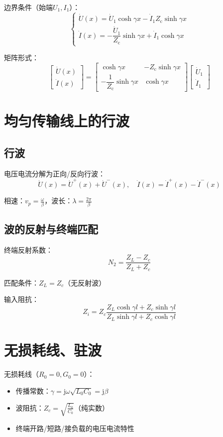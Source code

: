 边界条件（始端$U_1,I_1$）：
\[
\begin{cases} 
\dot{U}(x) = \dot{U}_1 \cosh \gamma x - \dot{I}_1 Z_{\mathrm{c}} \sinh \gamma x \\ 
\dot{I}(x) = -\dfrac{\dot{U}_1}{Z_{\mathrm{c}}} \sinh \gamma x + \dot{I}_1 \cosh \gamma x 
\end{cases}
\]

矩阵形式：
\[
\begin{bmatrix} 
\dot{U}(x) \\ 
\dot{I}(x) 
\end{bmatrix} = 
\begin{bmatrix} 
\cosh \gamma x & -Z_{\text{c}} \sinh \gamma x \\ 
-\dfrac{1}{Z_{\text{c}}} \sinh \gamma x & \cosh \gamma x 
\end{bmatrix}
\begin{bmatrix} 
\dot{U}_1 \\ 
\dot{I}_1 
\end{bmatrix}
\]

\section{均匀传输线上的行波}
\subsection{行波}
电压电流分解为正向/反向行波：
\[
\dot{U}(x) = \dot{U}^+(x) + \dot{U}^-(x),\quad \dot{I}(x) = \dot{I}^+(x) - \dot{I}^-(x)
\]

相速：$v_p=\frac{\omega}{\beta}$，波长：$\lambda=\frac{2\pi}{\beta}$

\subsection{波的反射与终端匹配}
终端反射系数：
\[
N_2 = \frac{Z_L - Z_c}{Z_L + Z_c}
\]

匹配条件：$Z_L=Z_c$（无反射波）

输入阻抗：
\[
Z_i = Z_c \frac{Z_L \cosh \gamma l + Z_c \sinh \gamma l}{Z_L \sinh \gamma l + Z_c \cosh \gamma l}
\]

\section{无损耗线、驻波}
无损耗线（$R_0=0,G_0=0$）：
\begin{itemize}
    \item 传播常数：$\gamma = \mathrm{j}\omega\sqrt{L_0C_0} = \mathrm{j}\beta$
    \item 波阻抗：$Z_c = \sqrt{\frac{L_0}{C_0}}$（纯实数）
    \item 终端开路/短路/接负载的电压电流特性
\end{itemize}

